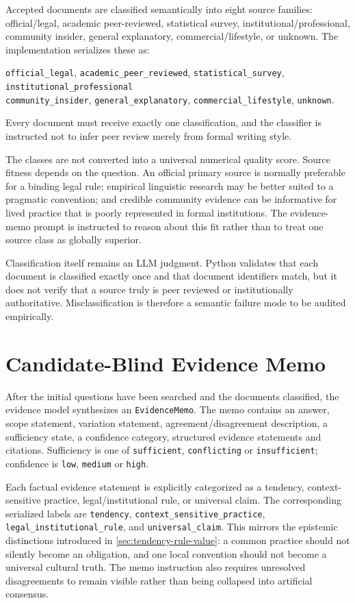 Accepted documents are classified semantically into eight source families: official/legal, academic peer-reviewed, statistical survey, institutional/professional, community insider, general explanatory, commercial/lifestyle, or unknown. The implementation serializes these as:
\begin{center}
\small
\texttt{official\_legal}, \texttt{academic\_peer\_reviewed}, \texttt{statistical\_survey}, \texttt{institutional\_professional}\\
\texttt{community\_insider}, \texttt{general\_explanatory}, \texttt{commercial\_lifestyle}, \texttt{unknown}.
\end{center}
Every document must receive exactly one classification, and the classifier is instructed not to infer peer review merely from formal writing style.

The classes are not converted into a universal numerical quality score. Source fitness depends on the question. An official primary source is normally preferable for a binding legal rule; empirical linguistic research may be better suited to a pragmatic convention; and credible community evidence can be informative for lived practice that is poorly represented in formal institutions. The evidence-memo prompt is instructed to reason about this fit rather than to treat one source class as globally superior.

Classification itself remains an LLM judgment. Python validates that each document is classified exactly once and that document identifiers match, but it does not verify that a source truly is peer reviewed or institutionally authoritative. Misclassification is therefore a semantic failure mode to be audited empirically.

\section{Candidate-Blind Evidence Memo}
\label{sec:evidence-memo}

After the initial questions have been searched and the documents classified, the evidence model synthesizes an \texttt{EvidenceMemo}. The memo contains an answer, scope statement, variation statement, agreement/disagreement description, a sufficiency state, a confidence category, structured evidence statements and citations. Sufficiency is one of \texttt{sufficient}, \texttt{conflicting} or \texttt{insufficient}; confidence is \texttt{low}, \texttt{medium} or \texttt{high}.

Each factual evidence statement is explicitly categorized as a tendency, context-sensitive practice, legal/institutional rule, or universal claim. The corresponding serialized labels are \texttt{tendency}, \texttt{context\_sensitive\_practice}, \texttt{legal\_institutional\_rule}, and \texttt{universal\_claim}. This mirrors the epistemic distinctions introduced in \cref{sec:tendency-rule-value}: a common practice should not silently become an obligation, and one local convention should not become a universal cultural truth. The memo instruction also requires unresolved disagreements to remain visible rather than being collapsed into artificial consensus.

